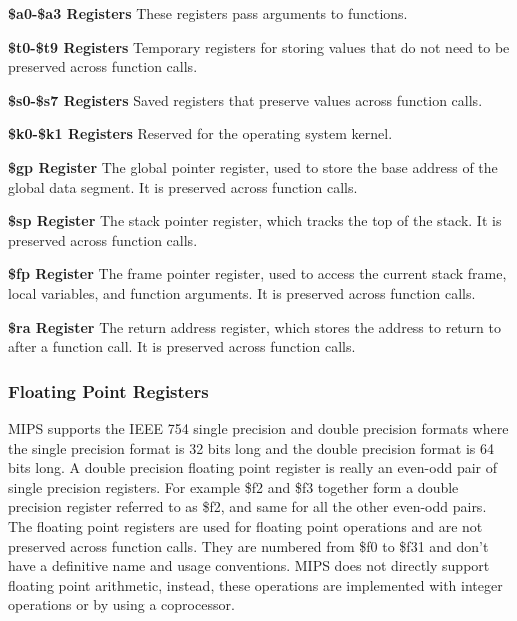 \textbf{\$a0-\$a3 Registers}\newline
These registers pass arguments to functions. 

\textbf{\$t0-\$t9 Registers}\newline
Temporary registers for storing values that do not need to be preserved across function calls.

\textbf{\$s0-\$s7 Registers}\newline
Saved registers that preserve values across function calls.

\textbf{\$k0-\$k1 Registers}\newline
Reserved for the operating system kernel.

\textbf{\$gp Register}\newline
The global pointer register, used to store the base address of the global data segment. It is preserved across function calls.

\textbf{\$sp Register}\newline
The stack pointer register, which tracks the top of the stack. It is preserved across function calls.

\textbf{\$fp Register}\newline
The frame pointer register, used to access the current stack frame, local variables, and function arguments. It is preserved across function calls.

\textbf{\$ra Register}\newline
The return address register, which stores the address to return to after a function call. It is preserved across function calls.

\subsubsection{Floating Point Registers}\label{sec:floating_point_registers}
MIPS supports the IEEE 754 single precision and double precision formats\cite{patterson1994computer} where the single precision format is 32 bits long and the double precision format is 64 bits long. A double precision floating point register is really an even-odd pair of single precision registers\cite{patterson1994computer}. For example \$f2 and \$f3 together form a double precision register referred to as \$f2, and same for all the other even-odd pairs. The floating point registers are used for floating point operations and are not preserved across function calls. They are numbered from \$f0 to \$f31 and don't have a definitive name and usage conventions. MIPS does not directly support floating point arithmetic\cite{hennessy1982mips}, instead, these operations are implemented with integer operations or by using a coprocessor.

